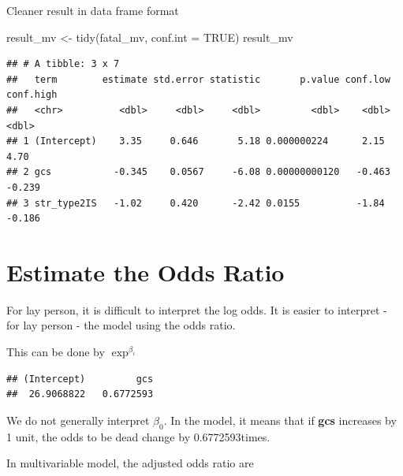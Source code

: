 \documentclass[
]{book}
\makeatletter
\newenvironment{Shaded}{\begin{snugshade}}{\end{snugshade}}
\newcommand{\AttributeTok}[1]{\textcolor[rgb]{0.61,0.61,0.61}{#1}}
\newcommand{\ConstantTok}[1]{\textcolor[rgb]{0,0,0}{#1}}
\newcommand{\DecValTok}[1]{\textcolor[rgb]{0.06,0.06,0.06}{#1}}
\newcommand{\FunctionTok}[1]{\textcolor[rgb]{0,0,0}{#1}}
\newcommand{\NormalTok}[1]{#1}
\newcommand{\OtherTok}[1]{\textcolor[rgb]{0.37,0.37,0.37}{#1}}
\newcommand{\SpecialCharTok}[1]{\textcolor[rgb]{0,0,0}{#1}}
\newenvironment{kframe}{%
\medskip{}
\setlength{\fboxsep}{.8em}
 \def\at@end@of@kframe{}%
 \ifinner\ifhmode%
  \def\at@end@of@kframe{\end{minipage}}%
  \begin{minipage}{\columnwidth}%
 \fi\fi%
 \def\FrameCommand##1{\hskip\@totalleftmargin \hskip-\fboxsep
 \colorbox{shadecolor}{##1}\hskip-\fboxsep
     \hskip-\linewidth \hskip-\@totalleftmargin \hskip\columnwidth}%
 \MakeFramed {\advance\hsize-\width
   \@totalleftmargin\z@ \linewidth\hsize
   \@setminipage}}%
 {\par\unskip\endMakeFramed%
 \at@end@of@kframe}
\renewenvironment{Shaded}{\begin{kframe}}{\end{kframe}}
\makeatother
\begin{document}
Cleaner result in data frame format

\begin{Shaded}
\begin{Highlighting}[]
\NormalTok{result\_mv }\OtherTok{\textless{}{-}} \FunctionTok{tidy}\NormalTok{(fatal\_mv, }\AttributeTok{conf.int =} \ConstantTok{TRUE}\NormalTok{)}
\NormalTok{result\_mv}
\end{Highlighting}
\end{Shaded}

\begin{verbatim}
## # A tibble: 3 x 7
##   term        estimate std.error statistic       p.value conf.low conf.high
##   <chr>          <dbl>     <dbl>     <dbl>         <dbl>    <dbl>     <dbl>
## 1 (Intercept)    3.35     0.646       5.18 0.000000224      2.15      4.70 
## 2 gcs           -0.345    0.0567     -6.08 0.00000000120   -0.463    -0.239
## 3 str_type2IS   -1.02     0.420      -2.42 0.0155          -1.84     -0.186
\end{verbatim}

\hypertarget{estimate-the-odds-ratio}{%
\section{Estimate the Odds Ratio}\label{estimate-the-odds-ratio}}

For lay person, it is difficult to interpret the log odds. It is easier to interpret - for lay person - the model using the odds ratio.

This can be done by \(\exp^{\beta_i}\)

\begin{Shaded}
\end{Shaded}

\begin{verbatim}
## (Intercept)         gcs 
##  26.9068822   0.6772593
\end{verbatim}

We do not generally interpret \(\hat\beta_0\). In the model, it means that if \textbf{gcs} increases by 1 unit, the odds to be dead change by 0.6772593times.

In multivariable model, the adjusted odds ratio are

\begin{Shaded}
\end{Shaded}
\end{document}
